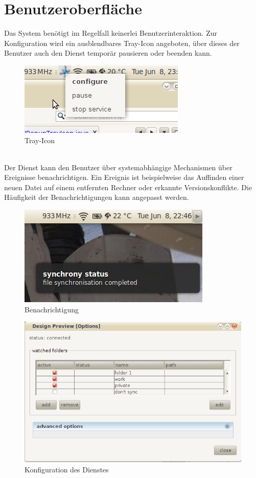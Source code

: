 \documentclass[12pt,oneside,a4paper,bibtotoc,liststotoc,pointlessnumbers]{scrartcl}
\begin{document}
\section{Benutzeroberfläche}
Das System benötigt im Regelfall keinerlei Benutzerinteraktion. Zur Konfiguration
wird ein ausblendbares Tray-Icon angeboten, über dieses der Benutzer auch den Dienst
temporär pausieren oder beenden kann.
\begin{figure}[h]
    \centering
    \includegraphics[scale=0.7]{img/tray.png}
    \caption{Tray-Icon}
\end{figure}
\\
Der Dienst kann den Benutzer über systemabhängige Mechanismen über Ereignisse benachrichtigen.
Ein Ereignis ist beispielweise das Auffinden einer neuen Datei auf einem entfernten Rechner
oder erkannte Versionskonflikte. Die Häufigkeit der Benachrichtigungen kann angepasst werden.
\begin{figure}[h]
    \centering
    \includegraphics[scale=0.7]{img/notification.png}
    \caption{Benachrichtigung}
\end{figure}
\begin{figure}[h]
    \centering
    \includegraphics[scale=0.7]{img/options.png}
    \caption{Konfiguration des Dienstes}
\end{figure}
\end{document}
